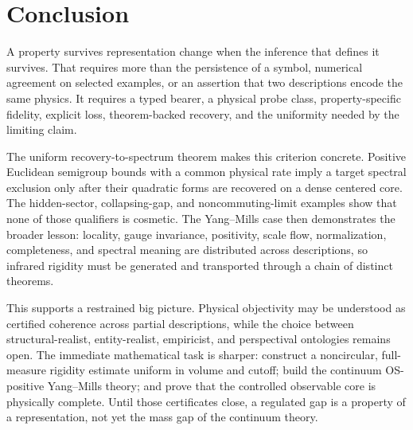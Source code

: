 \section{Conclusion}
\label{sec:conclusion}

A property survives representation change when the inference that defines it
survives.  That requires more than the persistence of a symbol, numerical
agreement on selected examples, or an assertion that two descriptions encode
the same physics.  It requires a typed bearer, a physical probe class,
property-specific fidelity, explicit loss, theorem-backed recovery, and the
uniformity needed by the limiting claim.

The uniform recovery-to-spectrum theorem makes this criterion concrete.
Positive Euclidean semigroup bounds with a common physical rate imply a target
spectral exclusion only after their quadratic forms are recovered on a dense
centered core.  The hidden-sector, collapsing-gap, and noncommuting-limit
examples show that none of those qualifiers is cosmetic.  The Yang--Mills
case then demonstrates the broader lesson: locality, gauge invariance,
positivity, scale flow, normalization, completeness, and spectral meaning are
distributed across descriptions, so infrared rigidity must be generated and
transported through a chain of distinct theorems.

This supports a restrained big picture.  Physical objectivity may be
understood as certified coherence across partial descriptions, while the
choice between structural-realist, entity-realist, empiricist, and
perspectival ontologies remains open.  The immediate mathematical task is
sharper: construct a noncircular, full-measure rigidity estimate uniform in
volume and cutoff; build the continuum OS-positive Yang--Mills theory; and
prove that the controlled observable core is physically complete.  Until
those certificates close, a regulated gap is a property of a representation,
not yet the mass gap of the continuum theory.
